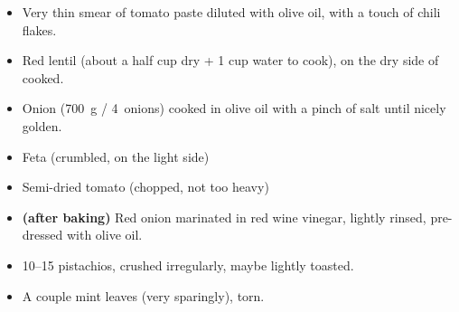 \begin{itemize}
\item Very thin smear of tomato paste diluted with olive oil, with a
  touch of chili flakes.
\item Red lentil (about a half cup dry + 1 cup water to cook), on the
  dry side of cooked.
\item Onion (700~g / 4~onions) cooked in olive oil with a pinch of
  salt until nicely golden.
\item Feta (crumbled, on the light side)
\item Semi-dried tomato (chopped, not too heavy)
\item \textbf{(after baking)} Red onion marinated in red wine vinegar, lightly
  rinsed, pre-dressed with olive oil.
\item 10--15 pistachios, crushed irregularly, maybe lightly toasted.
\item A couple mint leaves (very sparingly), torn.
\end{itemize}

%
